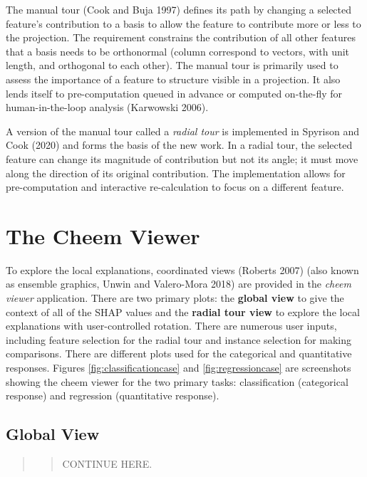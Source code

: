 \documentclass[11pt,twoside]{article}
\begin{document}
The manual tour (Cook and Buja 1997) defines its path by changing a selected feature's contribution to a basis to allow the feature to contribute more or less to the projection. The requirement constrains the contribution of all other features that a basis needs to be orthonormal (column correspond to vectors, with unit length, and orthogonal to each other). The manual tour is primarily used to assess the importance of a feature to structure visible in a projection. It also lends itself to pre-computation queued in advance or computed on-the-fly for human-in-the-loop analysis (Karwowski 2006).

A version of the manual tour called a \emph{radial tour} is implemented in Spyrison and Cook (2020) and forms the basis of the new work. In a radial tour, the selected feature can change its magnitude of contribution but not its angle; it must move along the direction of its original contribution. The implementation allows for pre-computation and interactive re-calculation to focus on a different feature.

\hypertarget{sec:cheemviewer}{%
\section{The Cheem Viewer}\label{sec:cheemviewer}}

To explore the local explanations, coordinated views (Roberts 2007) (also known as ensemble graphics, Unwin and Valero-Mora 2018) are provided in the \emph{cheem viewer} application. There are two primary plots: the \textbf{global view} to give the context of all of the SHAP values and the \textbf{radial tour view} to explore the local explanations with user-controlled rotation. There are numerous user inputs, including feature selection for the radial tour and instance selection for making comparisons. There are different plots used for the categorical and quantitative responses. Figures \ref{fig:classificationcase} and \ref{fig:regressioncase} are screenshots showing the cheem viewer for the two primary tasks: classification (categorical response) and regression (quantitative response).

\hypertarget{global-view}{%
\subsection{Global View}\label{global-view}}

\begin{quote}
\begin{quote}
CONTINUE HERE.
\end{quote}
\end{quote}
\end{document}
